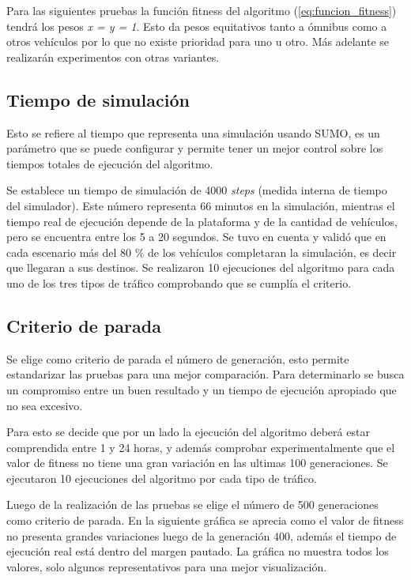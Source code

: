 Para las siguientes pruebas la función fitness del algoritmo (\ref{eq:funcion_fitness}) tendrá los pesos \emph{x = y = 1}. Esto da pesos equitativos tanto a ómnibus como a otros vehículos por lo que no existe prioridad para uno u otro. Más adelante se realizarán experimentos con otras variantes.


\subsection{Tiempo de simulación}
Esto se refiere al tiempo que representa una simulación usando SUMO,  es un parámetro que se puede configurar y permite tener un mejor control sobre los tiempos totales de ejecución del algoritmo.

Se establece un tiempo de simulación de 4000 \emph{steps} (medida interna de tiempo del simulador). Este número representa 66 minutos en la simulación, mientras el tiempo real de ejecución depende de la plataforma y de la cantidad de vehículos, pero se encuentra entre los 5 a 20 segundos. Se tuvo en cuenta y validó que en cada escenario más del 80 \% de los vehículos completaran la simulación, es decir que llegaran a sus destinos. Se realizaron 10 ejecuciones del algoritmo para cada uno de los tres tipos de tráfico comprobando que se cumplía el criterio.


\subsection{Criterio de parada}
Se elige como criterio de parada el número de generación, esto permite estandarizar las pruebas para una mejor comparación. Para determinarlo se busca un compromiso entre un buen resultado y un tiempo de ejecución apropiado que no sea excesivo.

Para esto se decide que por un lado la ejecución del algoritmo deberá estar comprendida entre 1 y 24 horas, y además comprobar experimentalmente que el valor de fitness no tiene una gran variación en las ultimas 100 generaciones. Se ejecutaron 10 ejecuciones del algoritmo por cada tipo de tráfico.

Luego de la realización de las pruebas se elige el número de 500 generaciones como criterio de parada.
En la siguiente gráfica se aprecia como el valor de fitness no presenta grandes variaciones luego de la generación 400, además el tiempo de ejecución real está dentro del margen pautado. La gráfica no muestra todos los valores, solo algunos representativos para una mejor visualización.



